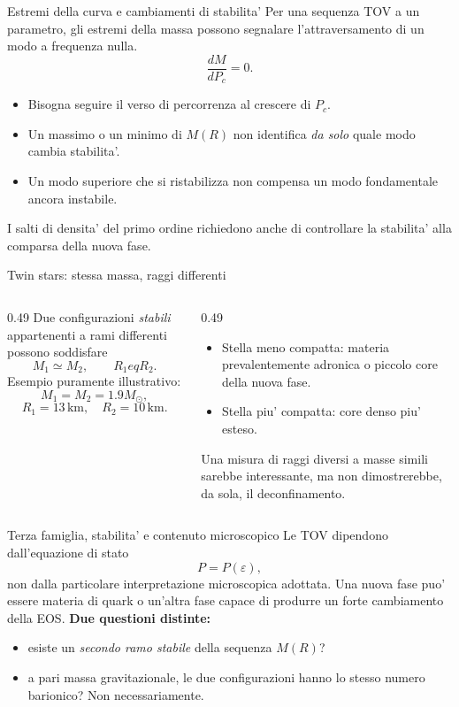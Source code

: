\begin{frame}{Estremi della curva e cambiamenti di stabilita'}
\small
Per una sequenza TOV a un parametro, gli estremi della massa
possono segnalare l'attraversamento di un modo a frequenza nulla.
\[
\frac{dM}{dP_c}=0.
\]
\begin{itemize}
\item Bisogna seguire il verso di percorrenza al crescere di $P_c$.
\item Un massimo o un minimo di $M(R)$ non identifica \emph{da solo}
quale modo cambia stabilita'.
\item Un modo superiore che si ristabilizza non compensa
un modo fondamentale ancora instabile.
\end{itemize}
I salti di densita' del primo ordine richiedono anche di controllare
la stabilita' alla comparsa della nuova fase.
\end{frame}

\begin{frame}{Twin stars: stessa massa, raggi differenti}
\small
\begin{columns}[T,onlytextwidth]
\begin{column}{0.49\textwidth}
Due configurazioni \emph{stabili} appartenenti a rami differenti
possono soddisfare
\[
M_1\simeq M_2,\qquad R_1
eq R_2.
\]
Esempio puramente illustrativo:
\[
M_1=M_2=1.9M_\odot,
\]
\[
R_1=13\,\mathrm{km},\quad R_2=10\,\mathrm{km}.
\]
\end{column}
\begin{column}{0.49\textwidth}
\begin{itemize}
\item Stella meno compatta: materia prevalentemente adronica
 o piccolo core della nuova fase.
\item Stella piu' compatta: core denso piu' esteso.
\end{itemize}
\medskip
Una misura di raggi diversi a masse simili sarebbe interessante,
ma non dimostrerebbe, da sola, il deconfinamento.
\end{column}
\end{columns}
\end{frame}

\begin{frame}{Terza famiglia, stabilita' e contenuto microscopico}
\small
Le TOV dipendono dall'equazione di stato
\[
P=P(\varepsilon),
\]
non dalla particolare interpretazione microscopica adottata.
\medskip
Una nuova fase puo' essere materia di quark o un'altra
fase capace di produrre un forte cambiamento della EOS.
\medskip
\textbf{Due questioni distinte:}
\begin{itemize}
\item esiste un \emph{secondo ramo stabile} della sequenza $M(R)$?
\item a pari massa gravitazionale, le due configurazioni
hanno lo stesso numero barionico? Non necessariamente.
\end{itemize}
\end{frame}

